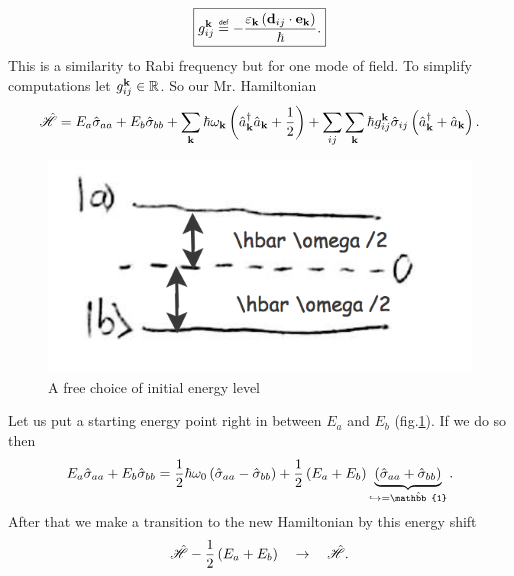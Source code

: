 \begin{equation}
	\boxed{	g_{ij}^{\kv} \myeq - \frac{ \varepsilon_{\kv} \left(\vec{d}_{ij} \cdot  \vec{e}_{\kv}\right)}{\hbar}.}
\end{equation}
This is a similarity to Rabi frequency but for one mode of field. To simplify computations let $g^{\mathbf{k}}_{ij} \in \mathbb{R}$. So our Mr. Hamiltonian 
\begin{equation}
	\hat{\mathscr{H}} = E_a \hat{\sigma}_{aa} + E_b \hat{\sigma}_{bb} + \sum_{\mathbf{k}} \hbar \omega_{\mathbf{k}} \left( \hat{a}^{\dagger}_{\mathbf{k}} \hat{a}_{\mathbf{k}} + \frac{1}{2} \right) + \sum_{ij} \sum_{\mathbf{k}} \hbar g_{ij}^{\mathbf{k}} \hat{\sigma}_{ij} \left( \hat{a}^{\dagger}_{\mathbf{k}} +  \hat{a}_{\mathbf{k}} \right).
\end{equation}
\begin{figure}
	\centering
	\includegraphics[width=0.4\linewidth]{fig/L6/E00000}
	\caption{A free choice of initial energy level}
	\label{fig:e00000}
\end{figure}
Let us put a starting energy point right in between $E_a$ and $E_b$ (fig.\ref{fig:e00000}). If we do so then
\begin{equation}
	E_a \hat{\sigma}_{aa} + E_b \hat{\sigma}_{bb} = \half \hbar \omega_0 \left( \hat{\sigma}_{aa} - \hat{\sigma}_{bb} \right) + \half \left( E_a + E_b \right)\underbrace{\left( \hat{\sigma}_{aa} + \hat{\sigma}_{bb} \right)}_{\hookrightarrow = \hat{\mathbb{1}}}.
\end{equation}
After that we make a transition to the new Hamiltonian by this energy shift
\begin{equation}
	\hat{\mathscr{H}} - \frac{1}{2} \left( E_a + E_b \right) \quad \to \quad \hat{\mathscr{H}}.
\end{equation}

